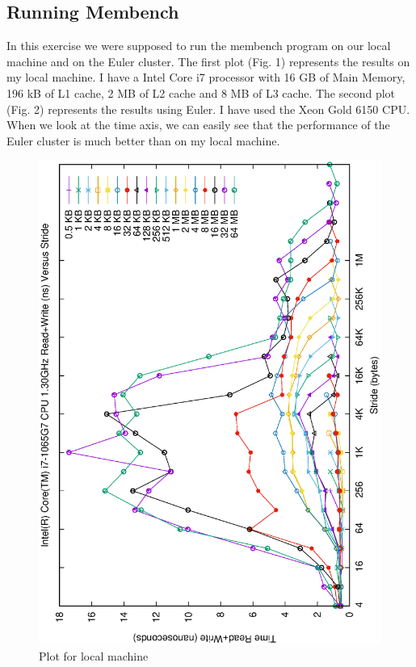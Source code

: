 \documentclass[unicode,11pt,a4paper,oneside,numbers=endperiod,openany]{scrartcl}
\begin{document}
\subsection{Running Membench}
In this exercise we were supposed to run the membench program on our local machine and on the Euler cluster.
The first plot (Fig. 1) represents the results on my local machine. I have a Intel Core i7 processor with 16 GB of Main Memory, 196 kB of L1 cache, 2 MB of L2 cache and 8 MB of L3 cache.
The second plot (Fig. 2) represents the results using Euler. I have used the Xeon Gold 6150 CPU.
When we look at the time axis, we can easily see that the performance of the Euler cluster is much better than on my local machine.
\begin{figure}[h!]
    \centering
    \includegraphics{../membench/generic.ps}
    \caption{Plot for local machine}
\end{figure}
\end{document}
